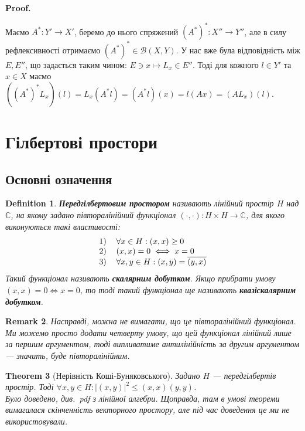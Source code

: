 \documentclass[a4paper, 10pt]{article}
\makeatletter
\theoremstyle{theoremdd}
\newtheorem{theorem}{Theorem}[subsection]
\theoremstyle{theoremdd}
\newtheorem{definition}[theorem]{Definition}
\theoremstyle{theoremdd}
\theoremstyle{theoremdd}
\theoremstyle{theoremdd}
\theoremstyle{theoremdd}
\newtheorem{remark}[theorem]{Remark}
\theoremstyle{theoremdd}
\theoremstyle{theoremdd}
\renewenvironment{proof}[1][Proof.\\]{\par
\pushQED{\hfill \qed}%
\normalfont \topsep6\p@\@plus6\p@\relax
\trivlist
\item\relax
{\bfseries
#1\@addpunct{.}}\hspace\labelsep\ignorespaces
}{%
\popQED\endtrivlist\@endpefalse
}
\makeatother
\begin{document}
\begin{proof}
Маємо $A^* \colon Y' \to X'$, беремо до нього спряжений $(A^*)^* \colon X'' \to Y''$, але в силу рефлексивності отримаємо $(A^*)^* \in \mathcal{B}(X,Y)$. У нас вже була відповідність між $E,E''$, що задається таким чином: $E \ni x \mapsto L_x \in E''$. Тоді для кожного $l \in Y'$ та $x \in X$ маємо\\
$((A^*)^*L_x)(l) = L_x(A^*l) = (A^*l)(x) = l(Ax) = (AL_x)(l)$.
\end{proof}
\newpage

\section{Гілбертові простори}
\subsection{Основні означення}
\begin{definition}
\textbf{Передгілбертовим простором} називають лінійний простір $H$ над $\mathbb{C}$, на якому задано півторалінійний функціонал $(\cdot, \cdot) \colon H \times H \to \mathbb{C}$, для якого виконуються такі властивості:
\begin{align*}
\begin{tabular}{cl}
1) & $\forall x \in H: (x, x) \geq 0$\\
2) & $(x, x) = 0 \iff x = 0$\\
3) & $\forall x,y \in H: (x, y) = \overline{(y, x)}$
\end{tabular}
\end{align*}
Такий функціонал називають \textbf{скалярним добутком}. Якщо прибрати умову $(x,x) = 0 \iff x = 0$, то тоді такий функціонал ще називають \textbf{квазіскалярним добутком}.
\end{definition}

\begin{remark}
Насправді, можна не вимагати, що це півторалінійний функціонал. Ми можемо просто додати четверту умову, що цей функціонал лінійний лише за першим аргументом, тоді випливатиме антилінійність за другим аргументом --- значить, буде півторалінійним.
\end{remark}

\begin{theorem}[Нерівність Коші-Буняковського]
Задано $H$ --- передгілбертів простір. Тоді $\forall x,y \in H: |(x,y)|^2 \leq (x,x)(y,y)$.\\
\textit{Було доведено, див.\ pdf з лінійної алгебри. Щоправда, там в умові теореми вимагалася скінченність векторного простору, але під час доведення це ми не використовували.}
\end{theorem}
\end{document}
